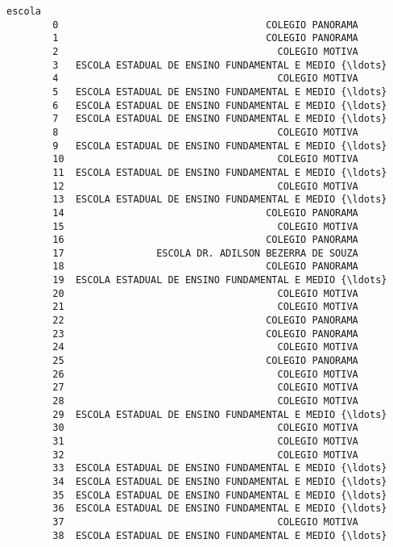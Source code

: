 \documentclass[11pt]{article}
\begin{document}
\begin{Verbatim}[commandchars=\\\{\}]
                                                       escola  
        0                                    COLEGIO PANORAMA  
        1                                    COLEGIO PANORAMA  
        2                                      COLEGIO MOTIVA  
        3   ESCOLA ESTADUAL DE ENSINO FUNDAMENTAL E MEDIO {\ldots}  
        4                                      COLEGIO MOTIVA  
        5   ESCOLA ESTADUAL DE ENSINO FUNDAMENTAL E MEDIO {\ldots}  
        6   ESCOLA ESTADUAL DE ENSINO FUNDAMENTAL E MEDIO {\ldots}  
        7   ESCOLA ESTADUAL DE ENSINO FUNDAMENTAL E MEDIO {\ldots}  
        8                                      COLEGIO MOTIVA  
        9   ESCOLA ESTADUAL DE ENSINO FUNDAMENTAL E MEDIO {\ldots}  
        10                                     COLEGIO MOTIVA  
        11  ESCOLA ESTADUAL DE ENSINO FUNDAMENTAL E MEDIO {\ldots}  
        12                                     COLEGIO MOTIVA  
        13  ESCOLA ESTADUAL DE ENSINO FUNDAMENTAL E MEDIO {\ldots}  
        14                                   COLEGIO PANORAMA  
        15                                     COLEGIO MOTIVA  
        16                                   COLEGIO PANORAMA  
        17                ESCOLA DR. ADILSON BEZERRA DE SOUZA  
        18                                   COLEGIO PANORAMA  
        19  ESCOLA ESTADUAL DE ENSINO FUNDAMENTAL E MEDIO {\ldots}  
        20                                     COLEGIO MOTIVA  
        21                                     COLEGIO MOTIVA  
        22                                   COLEGIO PANORAMA  
        23                                   COLEGIO PANORAMA  
        24                                     COLEGIO MOTIVA  
        25                                   COLEGIO PANORAMA  
        26                                     COLEGIO MOTIVA  
        27                                     COLEGIO MOTIVA  
        28                                     COLEGIO MOTIVA  
        29  ESCOLA ESTADUAL DE ENSINO FUNDAMENTAL E MEDIO {\ldots}  
        30                                     COLEGIO MOTIVA  
        31                                     COLEGIO MOTIVA  
        32                                     COLEGIO MOTIVA  
        33  ESCOLA ESTADUAL DE ENSINO FUNDAMENTAL E MEDIO {\ldots}  
        34  ESCOLA ESTADUAL DE ENSINO FUNDAMENTAL E MEDIO {\ldots}  
        35  ESCOLA ESTADUAL DE ENSINO FUNDAMENTAL E MEDIO {\ldots}  
        36  ESCOLA ESTADUAL DE ENSINO FUNDAMENTAL E MEDIO {\ldots}  
        37                                     COLEGIO MOTIVA  
        38  ESCOLA ESTADUAL DE ENSINO FUNDAMENTAL E MEDIO {\ldots}  

\end{Verbatim}
\end{document}

